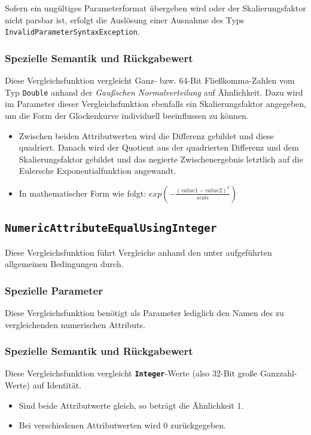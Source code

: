 Sofern ein ungültiges Parameterformat übergeben wird oder der Skalierungsfaktor nicht parsbar ist, erfolgt die Auslösung einer Ausnahme des Typs \texttt{InvalidParameterSyntaxException}.

\subsubsection*{Spezielle Semantik und Rückgabewert}
Diese Vergleichsfunktion vergleicht Ganz- bzw. 64-Bit Fließkomma-Zahlen vom Typ \texttt{Double} anhand der \emph{Gaußschen Normalverteilung} auf Ähnlichkeit. Dazu wird im Parameter dieser Vergleichsfunktion ebenfalls ein Skalierungsfaktor angegeben, um die Form der Glockenkurve individuell beeinflussen zu können.

\begin{itemize}
	\item Zwischen beiden Attributwerten wird die Differenz gebildet und diese quadriert. Danach wird der Quotient aus der quadrierten Differenz und dem Skalierungsfaktor gebildet und das negierte Zwischenergebnis letztlich auf die Eulersche Exponentialfunktion angewandt.
	\item In mathematischer Form wie folgt:  $exp\left(-\frac{(value1 - value2)^2}{scale}\right)$
\end{itemize}


%
%
\subsection{\texttt{NumericAttributeEqualUsingInteger}}
Diese Vergleichsfunktion führt Vergleiche anhand den unter  aufgeführten allgemeinen Bedingungen durch.

\subsubsection*{Spezielle Parameter}
Diese Vergleichsfunktion benötigt als Parameter lediglich den Namen des zu vergleichenden numerischen Attributs.

\subsubsection*{Spezielle Semantik und Rückgabewert}
Diese Vergleichsfunktion vergleicht \textbf{\texttt{Integer}}-Werte (also 32-Bit große Ganzzahl-Werte) auf Identität.
\begin{itemize}
	\item Sind beide Attributwerte gleich, so beträgt die Ähnlichkeit $1$.
	\item Bei verschiedenen Attributwerten wird $0$ zurückgegeben.
\end{itemize}


